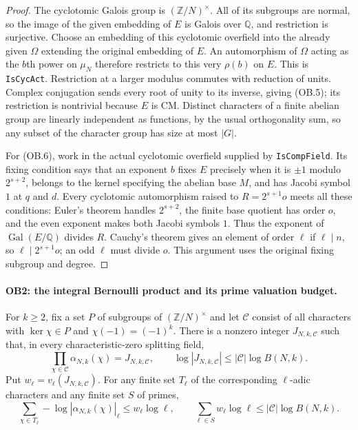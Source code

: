 \begin{proof}
The cyclotomic Galois group is $(\mathbb Z/N)^\times$.
All of its subgroups are normal, so the image of the given embedding
of $E$ is Galois over $\mathbb Q$, and restriction is surjective.
Choose an embedding of this cyclotomic overfield into the already
given $\Omega$ extending the original embedding of $E$.  An
automorphism of $\Omega$ acting as the $b$th power on $\mu_N$
therefore restricts to this very $\rho(b)$ on $E$.  This is
\texttt{IsCycAct}.  Restriction at a larger modulus commutes with
reduction of units.  Complex conjugation sends every root of unity
to its inverse, giving (OB.5); its restriction is nontrivial because
$E$ is CM.  Distinct characters of a finite abelian group are linearly
independent as functions, by the usual orthogonality sum, so any
subset of the character group has size at most $|G|$.

For (OB.6), work in the actual cyclotomic overfield supplied by
\texttt{IsCompField}.  Its fixing condition says that an exponent
$b$ fixes $E$ precisely when it is $\pm1$ modulo $2^{s+2}$,
belongs to the kernel specifying the abelian base $M$, and has
Jacobi symbol $1$ at $q$ and $d$.  Every cyclotomic automorphism
raised to $R=2^{s+1}o$ meets all these conditions: Euler's theorem
handles $2^{s+2}$, the finite base quotient has order $o$, and the
even exponent makes both Jacobi symbols $1$.  Thus the exponent of
$\operatorname{Gal}(E/\mathbb Q)$ divides $R$.  Cauchy's theorem
gives an element of order $\ell$ if $\ell\mid n$, so
$\ell\mid2^{s+1}o$; an odd $\ell$ must divide $o$.
This argument uses the original fixing subgroup and degree.
\end{proof}

\paragraph{OB2: the integral Bernoulli product and its prime valuation budget.}
\label{claim:OB2}
For $k\ge2$, fix a set $P$ of subgroups of $(\mathbb Z/N)^\times$
and let $\mathcal C$ consist of all characters with $\ker\chi\in P$
and $\chi(-1)=(-1)^k$.  There is a nonzero integer $J_{N,k,\mathcal C}$
such that, in every characteristic-zero splitting field,
\[
 \prod_{\chi\in\mathcal C}\alpha_{N,k}(\chi)
     =J_{N,k,\mathcal C},\qquad
 \log|J_{N,k,\mathcal C}|\le|\mathcal C|\log B(N,k).
 \tag{OB.7}
\]
Put $w_\ell=v_\ell(J_{N,k,\mathcal C})$.  For any finite set
$T_\ell$ of the corresponding $\ell$-adic characters and any finite
set $S$ of primes,
\[
 \sum_{\chi\in T_\ell}-\log|\alpha_{N,k}(\chi)|_\ell
       \le w_\ell\log\ell,\qquad
 \sum_{\ell\in S}w_\ell\log\ell
       \le |\mathcal C|\log B(N,k).                 \tag{OB.8}
\]

